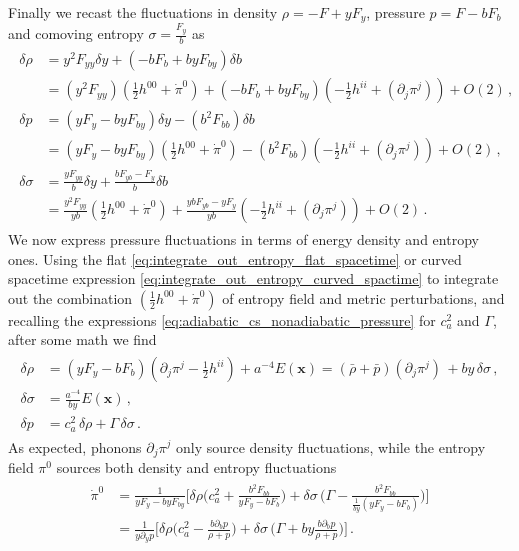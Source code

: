 Finally we recast the fluctuations in density $\rho=-F+yF_y$, pressure $p=F-bF_b$ and comoving entropy $\sigma=\tfrac{F_y}{b}$ as
\begin{align}\label{eq:rho_p_fluctuations_via_b_y}
\begin{aligned}
    \delta\rho &= y^2F_{yy}\delta y + (-bF_b+byF_{by})\delta b
    \\
    &= (y^2F_{yy})\left(\tfrac12 h^{00}+ \dot{\pi}^0\right) + (-bF_b+byF_{by})\left(-\tfrac12 h^{ii} +(\partial_j \pi^j)\right) + O(2)\,,
    \\[3pt]
    \delta p &= (yF_y-byF_{by})\delta y - (b^2 F_{bb})\delta b
    \\
    &= (yF_y-byF_{by})\left(\tfrac12 h^{00}+ \dot{\pi}^0\right) - (b^2 F_{bb})\left(-\tfrac12 h^{ii} +(\partial_j \pi^j)\right)+ O(2)\,,
    \\[3pt]
    \delta\sigma &= \tfrac{yF_{yy}}{b}\delta y + \tfrac{bF_{yb}-F_y}{b} \delta b
    \\
    &= \tfrac{y^2F_{yy}}{yb}\left(\tfrac12 h^{00}+ \dot{\pi}^0\right) +\tfrac{ybF_{yb}-yF_y}{yb}\left(-\tfrac12 h^{ii} +(\partial_j \pi^j)\right)+ O(2)\,.
\end{aligned}
\end{align}
We now express pressure fluctuations in terms of energy density and entropy ones.
Using the flat \eqref{eq:integrate_out_entropy_flat_spacetime} or curved spacetime expression \eqref{eq:integrate_out_entropy_curved_spactime} to integrate out the combination $\left(\tfrac12 h^{00}+ \dot{\pi}^0\right)$ of entropy field and metric perturbations, and recalling the expressions \eqref{eq:adiabatic_cs_nonadiabatic_pressure} for $c_a^2$ and $\Gamma$, after some math we find
\begin{align}\label{eq:rho_p_sigma_fluctuations_vs_phonon_entropy_field}
\begin{aligned}
    \delta\rho &= (yF_y-bF_b)(\partial_j\pi^j-\tfrac12 h^{ii})+a^{-4}E(\mathbf{x}) = (\bar{\rho}+\bar{p})(\partial_j\pi^j)\,+by\,\delta\sigma \,,\\[2.5pt]
    \delta\sigma &= \frac{a^{-4}}{by}E(\mathbf{x})\,,\\[2.5pt]
    \delta p &= c_a^2\, \delta\rho + \Gamma \, \delta\sigma\,.
\end{aligned}
\end{align}
As expected, phonons $\partial_j\pi^j$ only source density fluctuations, while the entropy field $\pi^0$ sources both density and entropy fluctuations 
\begin{align}\label{eq:entropy_field_vs_density_entropy_fluctuations}
\begin{aligned}
    \dot{\pi}^0&= \frac{1}{yF_y-byF_{by}}\bigg[\delta\rho \Big(c_a^2+\tfrac{b^2F_{bb}}{yF_y-bF_b}\Big)+\delta\sigma\,\Big(\Gamma-\tfrac{b^2F_{bb}}{\tfrac{1}{by}(yF_y-bF_b)}\Big)\bigg]\\[2.5pt]
    &=\tfrac{1}{y\partial_yp}\bigg[\delta\rho \Big(c_a^2-\tfrac{b\partial_bp}{\rho+p}\Big)+\delta\sigma\,\Big(\Gamma+by\tfrac{b\partial_bp}{\rho+p}\Big)\bigg]\,.
\end{aligned}
\end{align}






